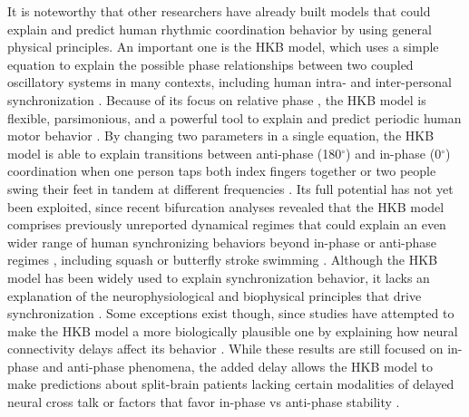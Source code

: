 \documentclass{report}
\begin{document}
It is noteworthy that other researchers have already built models that could explain and predict human rhythmic coordination behavior by using general physical principles. An important one is the HKB model, which uses a simple equation to explain the possible phase relationships between two coupled oscillatory systems in many contexts, including human intra- and inter-personal synchronization \cite{slowinski2016effects}. Because of its focus on relative phase \cite{calvin2010perspectives}, the HKB model is flexible, parsimonious, and a powerful tool to explain and predict periodic human motor behavior \cite{schmidt1990phase}. By changing two parameters in a single equation, the HKB model is able to explain transitions between anti-phase (180$^\circ$) and in-phase (0$^\circ$) coordination when one person taps both index fingers together or two people swing their feet in tandem at different frequencies \cite{schmidt1990phase}. Its full potential has not yet been exploited, since recent bifurcation analyses revealed that the HKB model comprises previously unreported dynamical regimes that could explain an even wider range of human synchronizing behaviors beyond in-phase or anti-phase regimes \cite{avitabile2016beyond}, including squash \cite{mcgarry2006identifying} or butterfly stroke swimming \cite{ehrlacher2003sports}. Although the HKB model has been widely used to explain synchronization behavior, it lacks an explanation of the neurophysiological and biophysical principles that drive synchronization \cite{peper2004explanatory}. Some exceptions exist though, since studies have attempted to make the HKB model a more biologically plausible one by explaining how neural connectivity delays affect its behavior \cite{banerjee2007neural, slowinski2016effects}. While these results are still focused on in-phase and anti-phase phenomena, the added delay allows the HKB model to make predictions about split-brain patients lacking certain modalities of delayed neural cross talk \cite{banerjee2007neural} or factors that favor in-phase vs anti-phase stability \cite{slowinski2016effects}.
\end{document}
